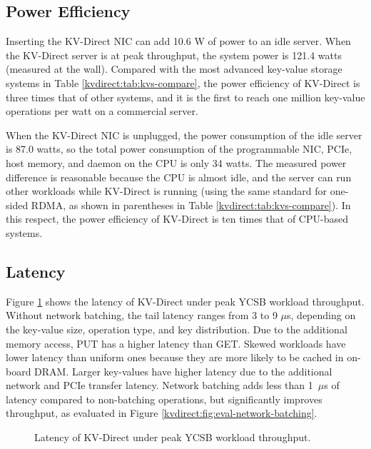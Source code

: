 \subsection{Power Efficiency}

Inserting the KV-Direct NIC can add 10.6 W of power to an idle server.
When the KV-Direct server is at peak throughput, the system power is 121.4 watts (measured at the wall).
Compared with the most advanced key-value storage systems in Table \ref {kvdirect:tab:kvs-compare}, the power efficiency of KV-Direct is three times that of other systems, and it is the first to reach one million key-value operations per watt on a commercial server.

When the KV-Direct NIC is unplugged, the power consumption of the idle server is 87.0 watts, so the total power consumption of the programmable NIC, PCIe, host memory, and daemon on the CPU is only 34 watts.
The measured power difference is reasonable because the CPU is almost idle, and the server can run other workloads while KV-Direct is running (using the same standard for one-sided RDMA, as shown in parentheses in Table \ref{kvdirect:tab:kvs-compare}).
In this respect, the power efficiency of KV-Direct is ten times that of CPU-based systems.

\subsection{Latency}

Figure \ref {kvdirect:fig:ycsb-lat} shows the latency of KV-Direct under peak YCSB workload throughput. Without network batching, the tail latency ranges from 3 to 9 $\mu$s, depending on the key-value size, operation type, and key distribution. Due to the additional memory access, PUT has a higher latency than GET. Skewed workloads have lower latency than uniform ones because they are more likely to be cached in on-board DRAM. Larger key-values have higher latency due to the additional network and PCIe transfer latency. Network batching adds less than 1~$\mu$s of latency compared to non-batching operations, but significantly improves throughput, as evaluated in Figure \ref {kvdirect:fig:eval-network-batching}.

\begin{figure}[htbp]
	\centering
	\caption{Latency of KV-Direct under peak YCSB workload throughput.}
	\label{kvdirect:fig:ycsb-lat}
\end{figure}

